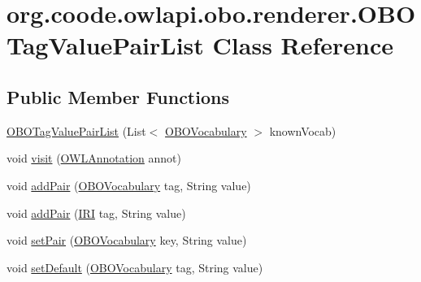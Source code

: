 \hypertarget{classorg_1_1coode_1_1owlapi_1_1obo_1_1renderer_1_1_o_b_o_tag_value_pair_list}{\section{org.\-coode.\-owlapi.\-obo.\-renderer.\-O\-B\-O\-Tag\-Value\-Pair\-List Class Reference}
\label{classorg_1_1coode_1_1owlapi_1_1obo_1_1renderer_1_1_o_b_o_tag_value_pair_list}
}
\subsection*{Public Member Functions}
\begin{DoxyCompactItemize}
\item 
\hyperlink{classorg_1_1coode_1_1owlapi_1_1obo_1_1renderer_1_1_o_b_o_tag_value_pair_list_ab6437220e17d8ee386a2bda5a992bb73}{O\-B\-O\-Tag\-Value\-Pair\-List} (List$<$ \hyperlink{enumorg_1_1coode_1_1owlapi_1_1obo_1_1parser_1_1_o_b_o_vocabulary}{O\-B\-O\-Vocabulary} $>$ known\-Vocab)
\item 
void \hyperlink{classorg_1_1coode_1_1owlapi_1_1obo_1_1renderer_1_1_o_b_o_tag_value_pair_list_a60df183bbe9e52e909205c50534f6a2a}{visit} (\hyperlink{interfaceorg_1_1semanticweb_1_1owlapi_1_1model_1_1_o_w_l_annotation}{O\-W\-L\-Annotation} annot)
\item 
void \hyperlink{classorg_1_1coode_1_1owlapi_1_1obo_1_1renderer_1_1_o_b_o_tag_value_pair_list_aca3711fe0f6829c547ad9857910bf571}{add\-Pair} (\hyperlink{enumorg_1_1coode_1_1owlapi_1_1obo_1_1parser_1_1_o_b_o_vocabulary}{O\-B\-O\-Vocabulary} tag, String value)
\item 
void \hyperlink{classorg_1_1coode_1_1owlapi_1_1obo_1_1renderer_1_1_o_b_o_tag_value_pair_list_a252d5fb820ce4a5bae1d7a0af13dbfaf}{add\-Pair} (\hyperlink{classorg_1_1semanticweb_1_1owlapi_1_1model_1_1_i_r_i}{I\-R\-I} tag, String value)
\item 
void \hyperlink{classorg_1_1coode_1_1owlapi_1_1obo_1_1renderer_1_1_o_b_o_tag_value_pair_list_af6526b912c2ba0a59452ec2c5d911b60}{set\-Pair} (\hyperlink{enumorg_1_1coode_1_1owlapi_1_1obo_1_1parser_1_1_o_b_o_vocabulary}{O\-B\-O\-Vocabulary} key, String value)
\item 
void \hyperlink{classorg_1_1coode_1_1owlapi_1_1obo_1_1renderer_1_1_o_b_o_tag_value_pair_list_a986dc5308d59f5dbf46e2f2af1785613}{set\-Default} (\hyperlink{enumorg_1_1coode_1_1owlapi_1_1obo_1_1parser_1_1_o_b_o_vocabulary}{O\-B\-O\-Vocabulary} tag, String value)

\end{DoxyCompactItemize}
